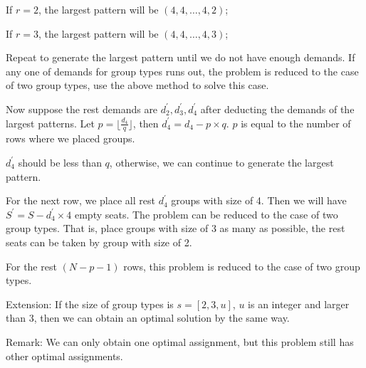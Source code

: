 If $r = 2$, the largest pattern will be $(4,4,\ldots,4,2)$;

If $r = 3$, the largest pattern will be $(4,4,\ldots,4,3)$;

Repeat to generate the largest pattern until we do not have enough demands.
If any one of demands for group types runs out, the problem is reduced to the case of two group types, use the above method to solve this case.

Now suppose the rest demands are $d_2^{'},d_3^{'},d_4^{'}$ after deducting the demands of the largest patterns. Let $p = \lfloor \frac{d_4}{q} \rfloor$, then $d_4^{'} = d_4 - p \times q$. $p$ is equal to the number of rows where we placed groups.

$d_4^{'}$ should be less than $q$, otherwise, we can continue to generate the largest pattern.

For the next row, we place all rest $d_4^{'}$ groups with size of 4. Then we will have $S^{'} = S - d_4^{'} \times 4$ empty seats. The problem can be reduced to the case of two group types. That is, place groups with size of 3 as many as possible, the rest seats can be taken by group with size of 2.

For the rest $(N-p-1)$ rows, this problem is reduced to the case of two group types.

Extension: If the size of group types is $s = [2,3,u]$, $u$ is an integer and larger than 3, then we can obtain an optimal solution by the same way.

Remark: We can only obtain one optimal assignment, but this problem still has other optimal assignments.


%
%
%
%


%
%
%
%


